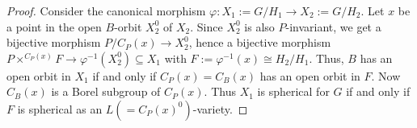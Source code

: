 \documentclass[10pt,a4paper]{amsart}
\renewcommand{\phi}{\varphi}
\begin{document}
\begin{proof}
  Consider the canonical morphism $\phi:X_1:=G/H_1\to X_2:=G/H_2$. Let $x$ be a
  point in the open $B$-orbit $X_2^0$ of $X_2$. Since $X_2^0$ is also
  $P$-invariant, we get a bijective morphism $P/C_P(x)\to X_2^0$, hence a
  bijective morphism
  $P\times^{C_P(x)}F\to\phi^{-1}(X_2^0)\subseteq X_1$ with
  $F :=\phi^{-1}(x)\cong H_2/H_1$. Thus, $B$ has an open orbit in $X_1$
  if and only if $C_P(x)=C_B(x)$ has an open orbit in $F$. Now
  $C_B(x)$ is a Borel subgroup of $C_P(x)$. Thus $X_1$ is spherical for $G$ if
  and only if $F$ is spherical as an $L (=C_P(x)^0)$-variety.
\end{proof}
\end{document}

